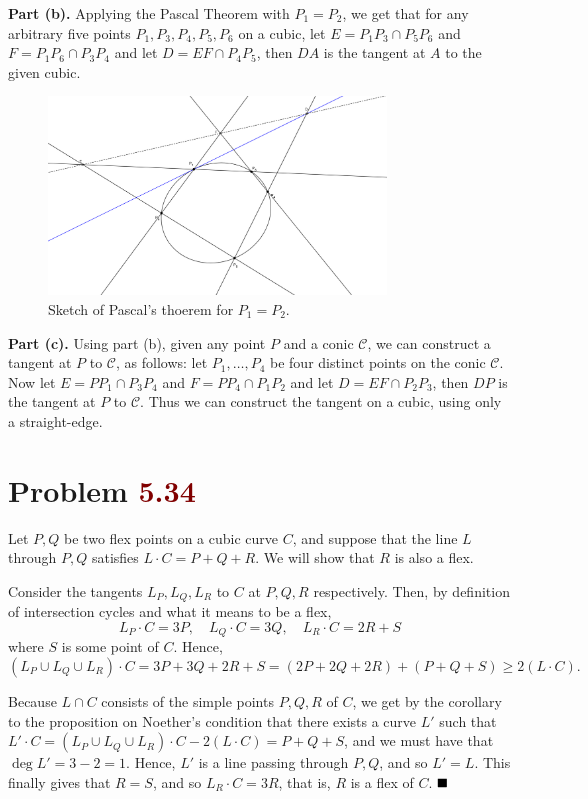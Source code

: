 \documentclass[12pt]{article}
\begin{document}
\textbf{Part (b).} Applying the Pascal Theorem with $P_1 = P_2$, we get that for any arbitrary five points $P_1, P_3, P_4, P_5, P_6$ on a cubic, let $E = P_1 P_3 \cap P_5 P_6$ and $F = P_1 P_6 \cap P_3 P_4$ and let $D = EF \cap P_4 P_5$, then $DA$ is the tangent at $A$ to the given cubic.
\begin{figure}[H]
   \centering
   \includegraphics[width=0.8\textwidth]{pascal2.png}
   \caption{Sketch of Pascal's thoerem for $P_1 = P_2$.}
\end{figure}

\textbf{Part (c).} Using part (b), given any point $P$ and a conic $\mathcal{C}$, we can construct a tangent at $P$ to $\mathcal{C}$, as follows: let $P_1, \dots, P_4$ be four distinct points on the conic $\mathcal{C}$. Now let $E = PP_1 \cap P_3P_4$ and $F = PP_4 \cap P_1 P_2$ and let $D = EF \cap P_2P_3$, then $DP$ is the tangent at $P$ to $\mathcal{C}$. Thus we can construct the tangent on a cubic, using only a straight-edge.

\section*{Problem \textcolor{maroon}{5.34}}
Let \( P,Q \) be two flex points on a cubic curve \( C \), and suppose that the line \( L \) through \( P,Q \) satisfies \( L \cdot C = P+Q+R \). We will show that \( R \) is also a flex.

Consider the tangents \( L_P, L_Q, L_R \) to \( C \) at \( P,Q,R \) respectively. Then, by definition of intersection cycles and what it means to be a flex,
\[
   L_P \cdot C =  3P, \quad L_Q \cdot C = 3Q, \quad L_R \cdot C = 2R+S
\]
where \( S \) is some point of \( C \). Hence,
\[
   (L_P \cup L_Q \cup L_R) \cdot C = 3P+3Q+2R+S =(2P+2Q+2R) + (P+Q+S) \geq 2(L \cdot C) .
\]

Because \( L \cap C \) consists of the simple points \( P,Q,R \) of \( C \), we get by the corollary to the proposition on Noether's condition that there exists a curve \( L' \) such that \( L' \cdot C = (L_P \cup L_Q \cup L_R) \cdot C - 2(L \cdot C) = P+Q+S \), and we must have that \( \deg L' = 3-2 = 1 \). Hence, \( L' \) is a line passing through \( P,Q \), and so \( L' = L \). This finally gives that \( R = S \), and so \( L_R \cdot C = 3R \), that is, \( R \) is a flex of \( C \). \(\hfill \blacksquare\)
\end{document}
